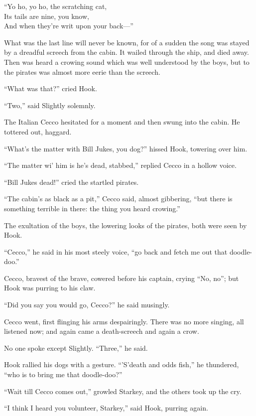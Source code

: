 \begin{center}
``Yo ho, yo ho, the scratching cat,\\
    Its tails are nine, you know,\\
And when they're writ upon your back---''
\end{center}

What was the last line will never be known, for of a sudden the song
was stayed by a dreadful screech from the cabin. It wailed through the
ship, and died away. Then was heard a crowing sound which was well
understood by the boys, but to the pirates was almost more eerie than
the screech.

``What was that?'' cried Hook.

``Two,'' said Slightly solemnly.

The Italian Cecco hesitated for a moment and then swung into the cabin.
He tottered out, haggard.

``What's the matter with Bill Jukes, you dog?'' hissed Hook, towering
over him.

``The matter wi' him is he's dead, stabbed,'' replied Cecco in a hollow
voice.

``Bill Jukes dead!'' cried the startled pirates.

``The cabin's as black as a pit,'' Cecco said, almost gibbering, ``but
there is something terrible in there: the thing you heard crowing.''

The exultation of the boys, the lowering looks of the pirates, both
were seen by Hook.

``Cecco,'' he said in his most steely voice, ``go back and fetch me out
that doodle-doo.''

Cecco, bravest of the brave, cowered before his captain, crying ``No,
no''; but Hook was purring to his claw.

``Did you say you would go, Cecco?'' he said musingly.

Cecco went, first flinging his arms despairingly. There was no more
singing, all listened now; and again came a death-screech and again a
crow.

No one spoke except Slightly. ``Three,'' he said.

Hook rallied his dogs with a gesture. ``'S'death and odds fish,'' he
thundered, ``who is to bring me that doodle-doo?''

``Wait till Cecco comes out,'' growled Starkey, and the others took up
the cry.

``I think I heard you volunteer, Starkey,'' said Hook, purring again.

